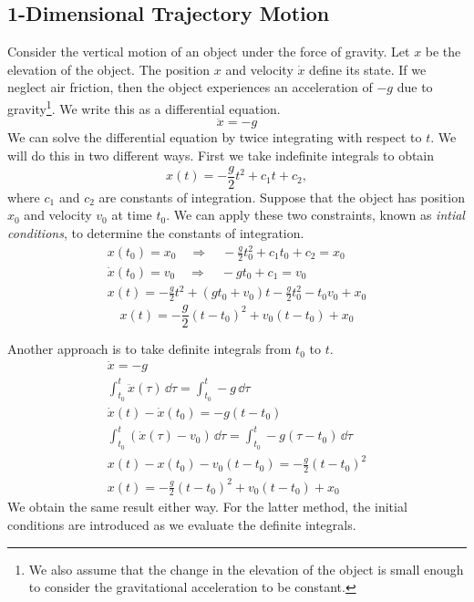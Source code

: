 \subsection{1-Dimensional Trajectory Motion}

Consider the vertical motion of an object under the force of gravity.
Let $x$ be the elevation of the object.  The position $x$ and velocity
$\dot{x}$ define its state.  If we neglect air friction, then the 
object experiences an acceleration of $-g$ due to gravity\footnote{
We also assume that the change in the elevation of the object is small enough
to consider the gravitational acceleration to be constant.}.
We write this as a differential equation.
\[
\ddot{x} = - g
\]
We can solve the differential equation by twice integrating with respect 
to $t$.  We will do this in two different ways.  First we take 
indefinite integrals to obtain
\[
x(t) = - \frac{g}{2} t^2 + c_1 t + c_2,
\]
where $c_1$ and $c_2$ are constants of integration.
Suppose that the object has position $x_0$ and velocity $v_0$ at time $t_0$.
We can apply these two constraints, known as \textit{intial conditions},
to determine the constants of integration.
\begin{gather*}
  x(t_0) = x_0 \quad \Rightarrow \quad - \frac{g}{2} t_0^2 + c_1 t_0 + c_2 = x_0
  \\
  \dot{x}(t_0) = v_0 \quad \Rightarrow \quad -g t_0 + c_1 = v_0
  \\
  x(t) = - \frac{g}{2} t^2 + (g t_0 + v_0) t 
  - \frac{g}{2} t_0^2 - t_0 v_0 + x_0
\end{gather*}
\begin{equation}
  \label{equation 1D trajectory solution}
  x(t) = - \frac{g}{2} (t - t_0)^2 + v_0 (t - t_0) + x_0
\end{equation}

Another approach is to take definite integrals from $t_0$ to $t$.
\begin{gather*}
  \ddot{x} = - g
  \\
  \int_{t_0}^t \ddot{x}(\tau) \,\dd \tau = \int_{t_0}^t -g \,\dd \tau 
  \\
  \dot{x}(t) - \dot{x}(t_0) = - g (t - t_0)
  \\
  \int_{t_0}^t (\dot{x}(\tau) - v_0) \,\dd \tau = \int_{t_0}^t -g (\tau - t_0) \,\dd \tau 
  \\
  x(t) - x(t_0) - v_0 (t - t_0) = - \frac{g}{2} (t - t_0)^2
  \\
  x(t) = - \frac{g}{2} (t - t_0)^2 + v_0 (t - t_0) + x_0
\end{gather*}
We obtain the same result either way.  For the latter method, the initial
conditions are introduced as we evaluate the definite integrals.

